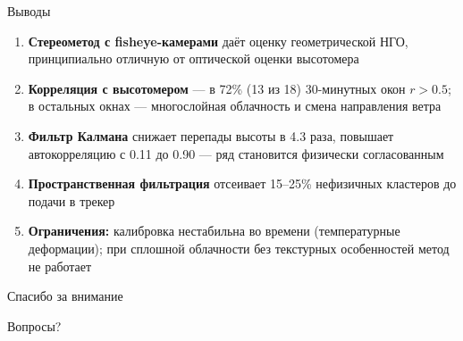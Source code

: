 \documentclass[11pt,aspectratio=169]{beamer}
\begin{document}
\begin{frame}{Выводы}
\begin{enumerate}
	\item \textbf{Стереометод с fisheye-камерами} даёт оценку геометрической НГО, принципиально отличную от оптической оценки высотомера
	\item \textbf{Корреляция с высотомером} --- в 72\% (13 из 18) 30-минутных окон $r > 0.5$; в остальных окнах --- многослойная облачность и смена направления ветра
	\item \textbf{Фильтр Калмана} снижает перепады высоты в 4.3 раза, повышает автокорреляцию с 0.11 до 0.90 --- ряд становится физически согласованным
	\item \textbf{Пространственная фильтрация} отсеивает 15--25\% нефизичных кластеров до подачи в трекер
	\item \textbf{Ограничения:} калибровка нестабильна во времени (температурные деформации); при сплошной облачности без текстурных особенностей метод не работает
\end{enumerate}
\end{frame}

\begin{frame}{Спасибо за внимание}
\begin{center}
\Large
Вопросы?
\end{center}
\end{frame}
\end{document}
